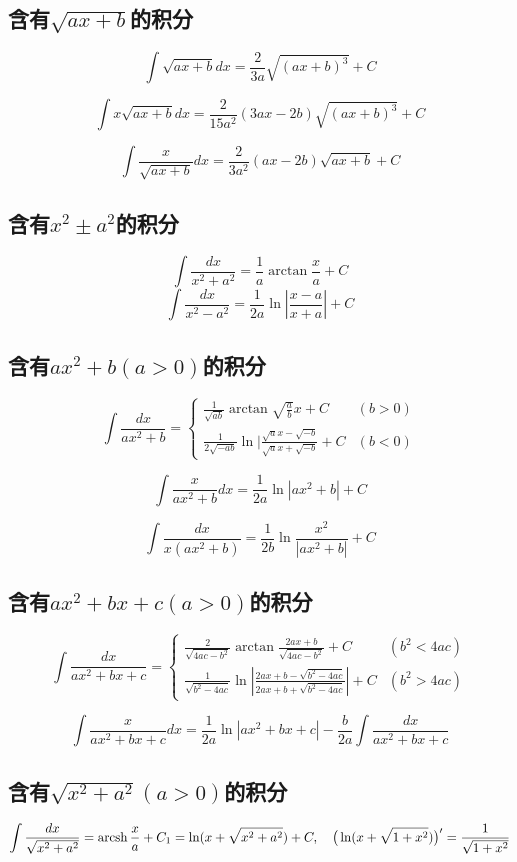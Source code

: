 \subsection{含有$\sqrt{ax+b}$的积分}
$$
\int \sqrt{ax+b}dx=\frac{2}{3a}\sqrt{(ax+b)^3}+C
$$

$$
\int x\sqrt{ax+b}dx=\frac{2}{15a^2}(3ax-2b)\sqrt{(ax+b)^3}+C
$$

$$
\int \frac{x}{\sqrt{ax+b}}dx=\frac{2}{3a^2}(ax-2b)\sqrt{ax+b}+C
$$

\subsection{含有$x^2 \pm a^2$的积分}
$$
\int \frac{dx}{x^2+a^2}=\frac{1}{a}\arctan \frac{x}{a}+C
$$
$$
\int \frac{dx}{x^2-a^2}=\frac{1}{2a}\ln |\frac{x-a}{x+a}|+C
$$
\subsection{含有$ax^2+b(a>0)$的积分}
$$
\int \frac{dx}{ax^2+b}=
\left\{
		\begin{array}{ll}
			\frac{1}{\sqrt{ab}}\arctan \sqrt{\frac{a}{b}}x+C & (b>0) \\
			\frac{1}{2\sqrt{-ab}}\ln|\frac{\sqrt{a}x-\sqrt{-b}}{\sqrt{a}x+\sqrt{-b}}+C & (b<0)
		\end{array}
		\right.
$$

$$
\int \frac{x}{ax^2+b}dx=\frac{1}{2a}\ln |ax^2+b|+C
$$

$$
\int \frac{dx}{x(ax^2+b)}=\frac{1}{2b}\ln \frac{x^2}{|ax^2+b|}+C
$$

\subsection{含有$ax^2+bx+c(a>0)$的积分}
$$
\int \frac{ dx}{ax^2+bx+c}=
\left\{
		\begin{array}{ll}
		 \frac{2}{\sqrt{4ac-b^2}}\arctan \frac{2ax+b}{\sqrt{4ac-b^2}}+C & (b^2<4ac) \\
		 \frac{1}{\sqrt{b^2-4ac}}\ln|\frac{2ax+b-\sqrt{b^2-4ac}}{2ax+b+\sqrt{b^2-4ac}}|+C & (b^2>4ac)
		\end{array}
		\right.
$$

$$
\int \frac{x}{ax^2+bx+c}dx=\frac{1}{2a}\ln|ax^2+bx+c|-\frac{b}{2a}\int \frac{dx}{ax^2+bx+c}
$$

\subsection{含有$\sqrt{x^2+a^2}(a>0)$的积分}
$$
\int \frac{dx}{\sqrt{x^2+a^2}}=\operatorname{arcsh} \frac{x}{a}+C_1=\ln(x+\sqrt{x^2+a^2})+C,\quad \big( \ln(x+\sqrt{1+x^2})\big)'=\frac{1}{\sqrt{1+x^2}}
$$

